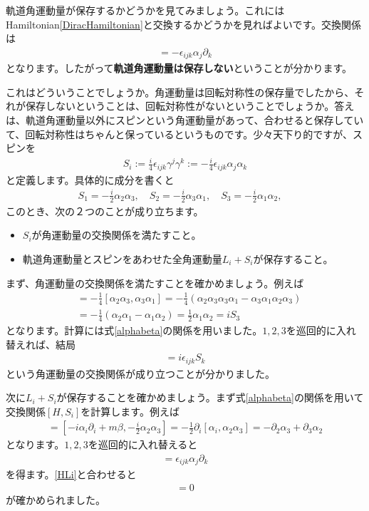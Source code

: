 \documentclass[report,paper=a4, fontsize=12pt, line_length=16cm, number_of_lines=33,dvipdfmx]{jlreq}
\numberwithin{equation}{chapter}
\newcommand{\del}{\partial}
\newcommand{\strong}[1]{{\sffamily \bfseries #1}}
\begin{document}
軌道角運動量が保存するかどうかを見てみましょう。これにはHamiltonian\eqref{DiracHamiltonian}と交換するかどうかを見ればよいです。交換関係は
\begin{align}
  [H,L_i]=-\epsilon_{ijk}\alpha_{j}\del_{k}\label{HLi}
\end{align}
となります。したがって\strong{軌道角運動量は保存しない}ということが分かります。

これはどういうことでしょうか。角運動量は回転対称性の保存量でしたから、それが保存しないということは、回転対称性がないということでしょうか。答えは、軌道角運動量以外にスピンという角運動量があって、合わせると保存していて、回転対称性はちゃんと保っているというものです。少々天下り的ですが、スピンを
\begin{align}
  S_i
  :=\frac{i}{4}\epsilon_{ijk}\gamma^{j}\gamma^{k}
  :=-\frac{i}{4}\epsilon_{ijk}\alpha_{j}\alpha_{k}\label{spin1/2}
\end{align}
と定義します。具体的に成分を書くと
\begin{align}
  S_1=-\frac{i}{2}\alpha_{2}\alpha_{3},\quad
  S_2=-\frac{i}{2}\alpha_{3}\alpha_{1},\quad
  S_3=-\frac{i}{2}\alpha_{1}\alpha_{2},\quad
\end{align}
このとき、次の２つのことが成り立ちます。
\begin{itemize}
  \item $S_i$が角運動量の交換関係を満たすこと。
  \item 軌道角運動量とスピンをあわせた全角運動量$L_i+S_i$が保存すること。
\end{itemize}

まず、角運動量の交換関係を満たすことを確かめましょう。例えば
\begin{align}
  [S_1,S_2]&=-\frac{1}{4}[\alpha_{2}\alpha_{3},\alpha_{3}\alpha_{1}]
  =-\frac{1}{4}(\alpha_{2}\alpha_{3}\alpha_{3}\alpha_{1}-\alpha_{3}\alpha_{1}\alpha_{2}\alpha_{3})\nonumber\\
  &=-\frac{1}{4}(\alpha_{2}\alpha_{1}-\alpha_{1}\alpha_{2})
  =\frac{1}{2}\alpha_{1}\alpha_{2}
  =iS_3
\end{align}
となります。計算には式\eqref{alphabeta}の関係を用いました。$1,2,3$を巡回的に入れ替えれば、結局
\begin{align}
  [S_i,S_j]=i\epsilon_{ijk}S_k
\end{align}
という角運動量の交換関係が成り立つことが分かりました。

次に$L_i+S_i$が保存することを確かめましょう。まず式\eqref{alphabeta}の関係を用いて交換関係$[H,S_i]$を計算します。例えば
\begin{align}
  [H,S_1]
  =[-i\alpha_i\del_i+m\beta,-\frac{i}{2}\alpha_2\alpha_3]
  =-\frac12\del_{i}[\alpha_i,\alpha_2\alpha_3]
  =-\del_{2}\alpha_{3}+\del_{3}\alpha_{2}
\end{align}
となります。$1,2,3$を巡回的に入れ替えると
\begin{align}
  [H,S_i]=\epsilon_{ijk}\alpha_{j}\del_{k}
\end{align}
を得ます。\eqref{HLi}と合わせると
\begin{align}
  [H,L_i+S_i]=0
\end{align}
が確かめられました。
\end{document}
